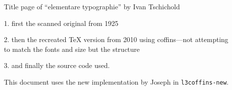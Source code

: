 \documentclass{article}
\begin{document}
\vspace*{3cm}
\begin{center}
  {\Large Title page of ``elementare typographie'' by Ivan Tschichold\par}

\large
\vspace*{1cm}

  1. first the scanned original from 1925

\vspace*{6mm}

  2. then the recreated \TeX{} version from 2010 using coffins---not
     attempting\\ to match the fonts and size but the structure

\vspace*{6mm}

  3. and finally the source code used.

     This document uses the new
     implementation by Joseph in \texttt{l3coffins-new}.

\end{center}

\newpage

\TypesetCoffin \Result
\end{document}
